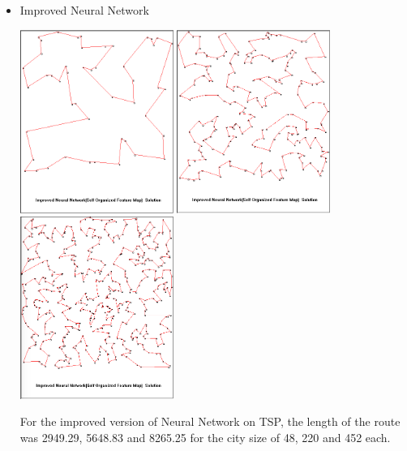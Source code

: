 \documentclass[12pt]{article}
\begin{document}
\begin{itemize}
\item Improved Neural Network
		\begin{center}
			\includegraphics[width=5cm]{ImprovedNeural48.PNG}
            \includegraphics[width=5cm]{ImprovedNeural220.PNG}
            \includegraphics[width=5cm]{ImprovedNeural452.png}
		\end{center}
        
For the improved version of Neural Network on TSP, the length of the route was 2949.29, 5648.83 and 8265.25 for the city size of 48, 220 and 452 each.         
        

\end{itemize}
\end{document}
